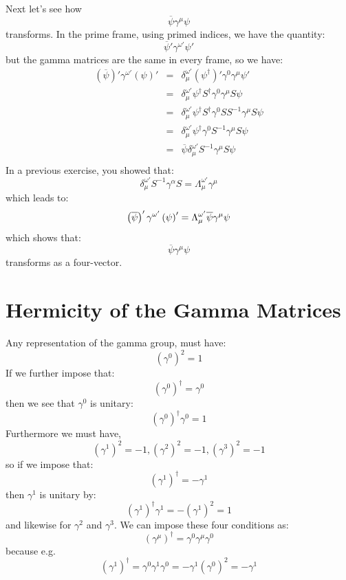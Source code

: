 \documentclass[12pt]{article}
\begin{document}
Next let's see how
$$\overline{\psi} \gamma^\mu \psi$$
transforms.  In the prime frame, using primed indices, we have the quantity:
$$\overline{\psi}' \gamma^{\omega'} \psi'$$
but the gamma matrices are the same in every frame, so we have:
\begin{eqnarray*}
  \left( \overline{\psi} \right)' \gamma^{\omega'} \left( \psi \right)'
  &=& \delta^{\omega'}_\mu \left( \psi^\dagger \right)' \gamma^0  \gamma^{\mu} \psi' \\
  &=& \delta^{\omega'}_\mu \psi^\dagger S^\dagger \gamma^0  \gamma^{\mu} S \psi \\
  &=& \delta^{\omega'}_\mu \psi^\dagger S^\dagger \gamma^0  S S^{-1} \gamma^{\mu} S \psi \\
  &=& \delta^{\omega'}_\mu \psi^\dagger \gamma^0  S^{-1} \gamma^{\mu} S \psi \\
  &=&  \overline{\psi}  \delta^{\omega'}_\mu S^{-1} \gamma^{\mu} S \psi \\
\end{eqnarray*}
In a previous exercise, you showed that:
$$\delta^{\omega'}_{\mu} S^{-1} \gamma^\alpha S = \Lambda_{\mu}^{\omega'} \gamma^{\mu}$$
which leads to:
\begin{equation}
  \left( \overline{\psi} \right)' \gamma^{\omega'} \left( \psi \right)'
  = \Lambda^{\omega'}_{\mu} \overline{\psi} \gamma^{\mu} \psi \\
\end{equation}
which shows that:
$$\overline{\psi} \gamma^{\mu} \psi$$
transforms as a four-vector.


\section{Hermicity of the Gamma Matrices}

Any representation of the gamma group, must have:
$$(\gamma^0)^2=1$$
If we further impose that:
$$(\gamma^0)^\dagger = \gamma^0$$
then we see that $\gamma^0$ is unitary:
$$(\gamma^0)^\dagger \gamma^0 = 1$$
Furthermore we must have,
$$(\gamma^1)^2=-1, (\gamma^2)^2=-1, (\gamma^3)^2=-1$$
so if we impose that:
$$(\gamma^1)^\dagger = -\gamma^1$$
then $\gamma^1$ is unitary by:
$$(\gamma^1)^\dagger \gamma^1 = - (\gamma^1)^2 = 1$$
and likewise for $\gamma^2$ and $\gamma^3$.  We can impose these four conditions as:
$$(\gamma^\mu)^\dagger = \gamma^0 \gamma^\mu \gamma^0$$
because e.g.
$$(\gamma^1)^\dagger = \gamma^0 \gamma^1 \gamma^0 = - \gamma^1 (\gamma^0)^2 = -\gamma^1$$
\end{document}
